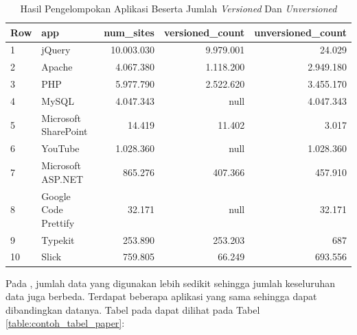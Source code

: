 \begin{table}[H]
\centering
\begin{tabular}{|l|l|r|r|r|}
	\hline
	\textbf{Row} & \textbf{app} & \textbf{num\_sites} & \textbf{versioned\_count} & \textbf{unversioned\_count}\\
	\hline
	1 & jQuery & 10.003.030 & 9.979.001 & 24.029\\
	\hline
	2 & Apache & 4.067.380 & 1.118.200 & 2.949.180\\
	\hline
	3 & PHP & 5.977.790 & 2.522.620 & 3.455.170\\
	\hline
	4 & MySQL & 4.047.343 & null & 4.047.343\\
	\hline
	5 & Microsoft SharePoint & 14.419 & 11.402 & 3.017\\
	\hline
	6 & YouTube & 1.028.360& null & 1.028.360\\
	\hline
	7 & Microsoft ASP.NET & 865.276 & 407.366 & 457.910\\
	\hline
	8 & Google Code Prettify & 32.171 & null & 32.171\\
	\hline
	9 & Typekit & 253.890 & 253.203 & 687\\
	\hline
	10 & Slick & 759.805 & 66.249 & 693.556\\
	\hline
\end{tabular}
\caption{Hasil Pengelompokan Aplikasi Beserta Jumlah \textit{Versioned} Dan \textit{Unversioned}}
\label{table:contoh_langkah3}
\end{table}

Pada \cite{pascal}, jumlah data yang digunakan lebih sedikit sehingga jumlah keseluruhan data juga berbeda. Terdapat beberapa aplikasi yang sama sehingga dapat dibandingkan datanya. Tabel pada \cite{pascal} dapat dilihat pada Tabel \ref{table:contoh_tabel_paper}: 

